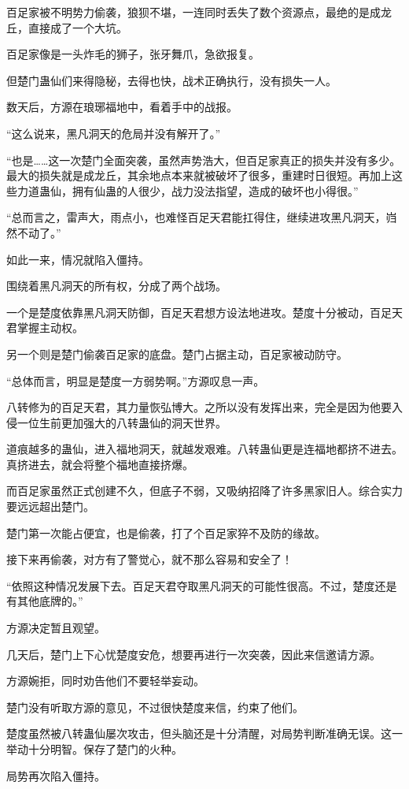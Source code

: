 \begin{this_body}
百足家被不明势力偷袭，狼狈不堪，一连同时丢失了数个资源点，最绝的是成龙丘，直接成了一个大坑。

百足家像是一头炸毛的狮子，张牙舞爪，急欲报复。

但楚门蛊仙们来得隐秘，去得也快，战术正确执行，没有损失一人。

数天后，方源在琅琊福地中，看着手中的战报。

“这么说来，黑凡洞天的危局并没有解开了。”

“也是……这一次楚门全面突袭，虽然声势浩大，但百足家真正的损失并没有多少。最大的损失就是成龙丘，其余地点本来就被破坏了很多，重建时日很短。再加上这些力道蛊仙，拥有仙蛊的人很少，战力没法指望，造成的破坏也小得很。”

“总而言之，雷声大，雨点小，也难怪百足天君能扛得住，继续进攻黑凡洞天，岿然不动了。”

如此一来，情况就陷入僵持。

围绕着黑凡洞天的所有权，分成了两个战场。

一个是楚度依靠黑凡洞天防御，百足天君想方设法地进攻。楚度十分被动，百足天君掌握主动权。

另一个则是楚门偷袭百足家的底盘。楚门占据主动，百足家被动防守。

“总体而言，明显是楚度一方弱势啊。”方源叹息一声。

八转修为的百足天君，其力量恢弘博大。之所以没有发挥出来，完全是因为他要入侵一位生前更加强大的八转蛊仙的洞天世界。

道痕越多的蛊仙，进入福地洞天，就越发艰难。八转蛊仙更是连福地都挤不进去。真挤进去，就会将整个福地直接挤爆。

而百足家虽然正式创建不久，但底子不弱，又吸纳招降了许多黑家旧人。综合实力要远远超出楚门。

楚门第一次能占便宜，也是偷袭，打了个百足家猝不及防的缘故。

接下来再偷袭，对方有了警觉心，就不那么容易和安全了！

“依照这种情况发展下去。百足天君夺取黑凡洞天的可能性很高。不过，楚度还是有其他底牌的。”

方源决定暂且观望。

几天后，楚门上下心忧楚度安危，想要再进行一次突袭，因此来信邀请方源。

方源婉拒，同时劝告他们不要轻举妄动。

楚门没有听取方源的意见，不过很快楚度来信，约束了他们。

楚度虽然被八转蛊仙屡次攻击，但头脑还是十分清醒，对局势判断准确无误。这一举动十分明智。保存了楚门的火种。

局势再次陷入僵持。


\end{this_body}
